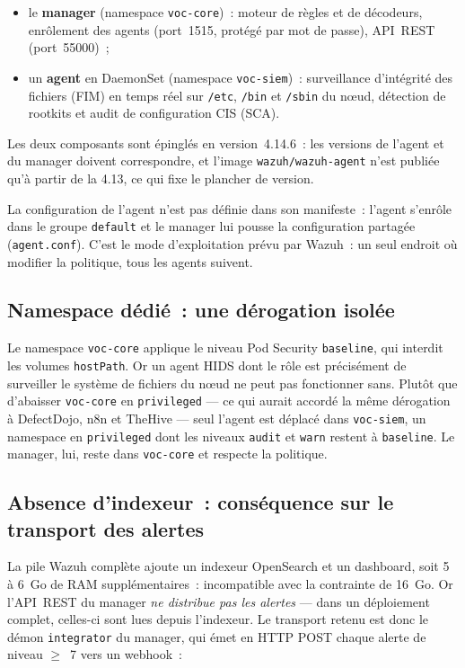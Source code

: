 \documentclass[12pt,a4paper]{report}
\begin{document}
\begin{itemize}[nosep]
    \item le \textbf{manager} (namespace \texttt{voc-core})~: moteur de règles et de décodeurs, enrôlement des agents (port~1515, protégé par mot de passe), API~REST (port~55000)~;
    \item un \textbf{agent} en DaemonSet (namespace \texttt{voc-siem})~: surveillance d'intégrité des fichiers (FIM) en temps réel sur \texttt{/etc}, \texttt{/bin} et \texttt{/sbin} du nœud, détection de rootkits et audit de configuration CIS (SCA).
\end{itemize}

Les deux composants sont épinglés en version~4.14.6~: les versions de l'agent et du manager doivent correspondre, et l'image \texttt{wazuh/wazuh-agent} n'est publiée qu'à partir de la 4.13, ce qui fixe le plancher de version.

La configuration de l'agent n'est pas définie dans son manifeste~: l'agent s'enrôle dans le groupe \texttt{default} et le manager lui pousse la configuration partagée (\texttt{agent.conf}). C'est le mode d'exploitation prévu par Wazuh~: un seul endroit où modifier la politique, tous les agents suivent.

\subsection{Namespace dédié~: une dérogation isolée}
Le namespace \texttt{voc-core} applique le niveau Pod Security \texttt{baseline}, qui interdit les volumes \texttt{hostPath}. Or un agent HIDS dont le rôle est précisément de surveiller le système de fichiers du nœud ne peut pas fonctionner sans. Plutôt que d'abaisser \texttt{voc-core} en \texttt{privileged} --- ce qui aurait accordé la même dérogation à DefectDojo, n8n et TheHive --- seul l'agent est déplacé dans \texttt{voc-siem}, un namespace en \texttt{privileged} dont les niveaux \texttt{audit} et \texttt{warn} restent à \texttt{baseline}. Le manager, lui, reste dans \texttt{voc-core} et respecte la politique.

\subsection{Absence d'indexeur~: conséquence sur le transport des alertes}
La pile Wazuh complète ajoute un indexeur OpenSearch et un dashboard, soit 5 à 6~Go de RAM supplémentaires~: incompatible avec la contrainte de 16~Go. Or l'API~REST du manager \emph{ne distribue pas les alertes} --- dans un déploiement complet, celles-ci sont lues depuis l'indexeur. Le transport retenu est donc le démon \texttt{integrator} du manager, qui émet en HTTP POST chaque alerte de niveau $\geq$~7 vers un webhook~:
\end{document}
